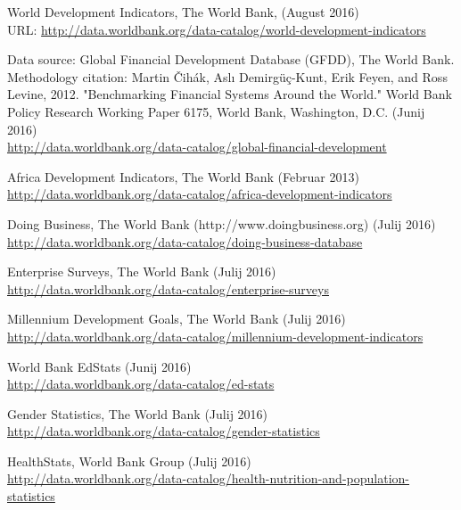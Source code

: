 \begin{thebibliography}{1}


 World Development Indicators, The World Bank, (August 2016)
\\ URL: \url{http://data.worldbank.org/data-catalog/world-development-indicators}

 Data source: Global Financial Development Database (GFDD), The World Bank. Methodology citation: Martin Čihák, Aslı Demirgüç-Kunt, Erik Feyen, and Ross Levine, 2012. "Benchmarking Financial Systems Around the World." World Bank Policy Research Working Paper 6175, World Bank, Washington, D.C. (Junij 2016)
\\ \url{http://data.worldbank.org/data-catalog/global-financial-development}


 Africa Development Indicators, The World Bank (Februar 2013)
\\ \url{http://data.worldbank.org/data-catalog/africa-development-indicators}

 Doing Business, The World Bank (http://www.doingbusiness.org) (Julij 2016)
\\ \url{http://data.worldbank.org/data-catalog/doing-business-database}

 Enterprise Surveys, The World Bank (Julij 2016)
\\ \url{http://data.worldbank.org/data-catalog/enterprise-surveys}

 Millennium Development Goals, The World Bank (Julij 2016)
\\ \url{http://data.worldbank.org/data-catalog/millennium-development-indicators}

 World Bank EdStats (Junij 2016)
\\ \url{http://data.worldbank.org/data-catalog/ed-stats}

 Gender Statistics, The World Bank (Julij 2016)
\\ \url{http://data.worldbank.org/data-catalog/gender-statistics}

 HealthStats, World Bank Group (Julij 2016)
\\ \url{http://data.worldbank.org/data-catalog/health-nutrition-and-population-statistics}


\end{thebibliography}
